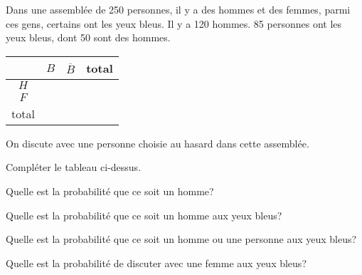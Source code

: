 
Dans une assemblée de 250 personnes, il y a des hommes et des femmes, parmi ces gens, certains ont les yeux bleus. Il y a 120 hommes. 85 personnes ont les yeux bleus, dont 50 sont des hommes.

\begin{center}
\begin{tabular}{|c|c|c|c|}
\hline 
 & $B$ & $\overline{B}$ & total \\ 
\hline 
$H$ & \hspace{1.5cm} &  & \hspace{1.5cm} \\ 
\hline 
$F$ & \hspace{1.5cm} & \hspace{1.5cm} & \hspace{1.5cm} \\ 
\hline 
total & \hspace{1.5cm} & \hspace{1.5cm} & \hspace{1.5cm} \\ 
\hline 
\end{tabular} 
\end{center}

On discute avec une personne choisie au hasard dans cette assemblée.

\question{}
Compléter le tableau ci-dessus.

\question{}
Quelle est la probabilité que ce soit un homme?

\question{}
Quelle est la probabilité que ce soit un homme aux yeux bleus?

\question{}
Quelle est la probabilité que ce soit un homme ou une personne aux yeux bleus?

\question{}
Quelle est la probabilité de discuter avec une femme aux yeux bleus?
